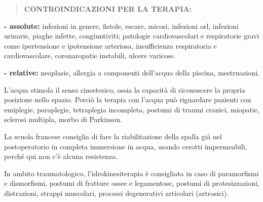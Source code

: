 \documentclass[]{article}
\begin{document}
\begin{quote}
\textbf{CONTROINDICAZIONI PER LA TERAPIA:}
\end{quote}

\textbf{- assolute:} infezioni in genere, fistole, escare, micosi,
infezioni orl, infezioni urinarie, piaghe infette, congiuntiviti;
patologie cardiovascolari e respiratorie gravi come ipertensione e
ipotensione arteriosa, insufficienza respiratoria e cardiovascolare,
coronaropatie instabili, ulcere varicose.

\textbf{- relative:} neoplasie, allergia a componenti dell'acqua della
piscina, mestruazioni.

L'acqua stimola il senso cinestesico, ossia la capacità di riconoscere
la propria posizione nello spazio. Perciò la terapia con l'acqua può
riguardare pazienti con emiplegie, paraplegie, tetraplegia incompleta,
postumi di traumi cranici, miopatie, sclerosi multipla, morbo di
Parkinson.

La scuola francese consiglia di fare la riabilitazione della spalla già
nel postoperatorio in completa immersione in acqua, usando cerotti
impermeabili, perché qui non c'è alcuna resistenza.

In ambito traumatologico, l'idrokinesiterapia è consigliata in caso di
paramorfismi e dismorfismi, postumi di fratture ossee e legamentose,
postumi di protesizzazioni, distrazioni, strappi muscolari, processi
degenerativi articolari (artrosici).
\end{document}
